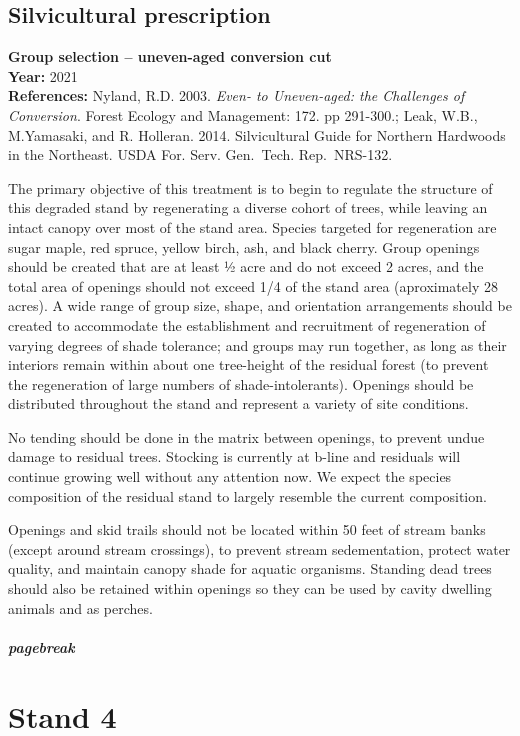 \documentclass[]{tufte-handout}
\begin{document}
\subsection{Silvicultural
prescription}\label{silvicultural-prescription-2}

\textbf{Group selection -- uneven-aged conversion cut}\\
\textbf{Year:} 2021\\
\textbf{References:} Nyland, R.D. 2003. \emph{Even- to Uneven-aged: the
Challenges of Conversion}. Forest Ecology and Management: 172. pp
291-300.; Leak, W.B., M.Yamasaki, and R. Holleran. 2014. Silvicultural
Guide for Northern Hardwoods in the Northeast. USDA For. Serv.
Gen.~Tech. Rep.~NRS-132.

The primary objective of this treatment is to begin to regulate the
structure of this degraded stand by regenerating a diverse cohort of
trees, while leaving an intact canopy over most of the stand area.
Species targeted for regeneration are sugar maple, red spruce, yellow
birch, ash, and black cherry. Group openings should be created that are
at least ½ acre and do not exceed 2 acres, and the total area of
openings should not exceed 1/4 of the stand area (aproximately 28
acres). A wide range of group size, shape, and orientation arrangements
should be created to accommodate the establishment and recruitment of
regeneration of varying degrees of shade tolerance; and groups may run
together, as long as their interiors remain within about one tree-height
of the residual forest (to prevent the regeneration of large numbers of
shade-intolerants). Openings should be distributed throughout the stand
and represent a variety of site conditions.

No tending should be done in the matrix between openings, to prevent
undue damage to residual trees. Stocking is currently at b-line and
residuals will continue growing well without any attention now. We
expect the species composition of the residual stand to largely resemble
the current composition.

Openings and skid trails should not be located within 50 feet of stream
banks (except around stream crossings), to prevent stream sedementation,
protect water quality, and maintain canopy shade for aquatic organisms.
Standing dead trees should also be retained within openings so they can
be used by cavity dwelling animals and as perches.

\subparagraph{pagebreak}\label{pagebreak-4}

\section{Stand 4}\label{stand-4}
\end{document}
